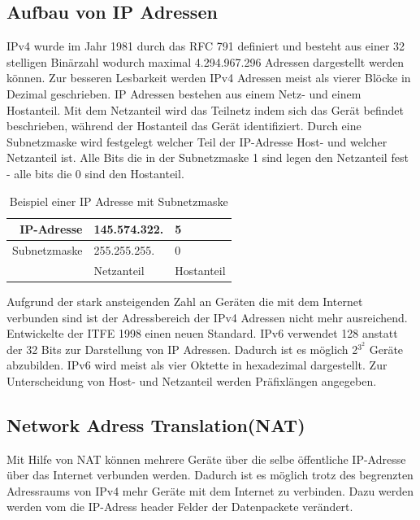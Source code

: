 \subsection{Aufbau von IP Adressen}
IPv4 wurde im Jahr 1981 durch das RFC 791\cite{rfc791} definiert und besteht aus einer 32 stelligen Binärzahl wodurch maximal 4.294.967.296 Adressen dargestellt werden können. Zur besseren Lesbarkeit werden IPv4 Adressen meist als vierer Blöcke in Dezimal geschrieben. IP Adressen bestehen aus einem Netz- und einem Hostanteil. Mit dem Netzanteil wird das Teilnetz indem sich das Gerät befindet beschrieben, während der Hostanteil das Gerät identifiziert. Durch eine Subnetzmaske wird festgelegt welcher Teil der IP-Adresse Host- und welcher Netzanteil ist. Alle Bits die in der Subnetzmaske 1 sind legen den Netzanteil fest - alle bits die 0 sind den Hostanteil.

\begin{table}
\begin{center}
\caption{Beispiel einer IP Adresse mit Subnetzmaske}
\begin{tabular}{|r|l|l|}
	\hline
	IP-Adresse & 145.574.322. & 5 \\ \hline
	Subnetzmaske & 255.255.255. & 0 \\ \hline
	& Netzanteil & Hostanteil \\
	\hline
\end{tabular}
\end{center}
\end{table}


Aufgrund der stark ansteigenden Zahl an Geräten die mit dem Internet verbunden sind ist der Adressbereich der IPv4 Adressen nicht mehr ausreichend. Entwickelte der ITFE 1998 einen neuen Standard. IPv6 verwendet 128 anstatt der 32 Bits zur Darstellung von IP Adressen. Dadurch ist es möglich 2$^3^2$ Geräte abzubilden. IPv6 wird meist als vier Oktette in hexadezimal dargestellt. Zur Unterscheidung von Host- und Netzanteil werden Präfixlängen angegeben.  

\subsection{Network Adress Translation(NAT)}
Mit Hilfe von NAT können mehrere Geräte über die selbe öffentliche IP-Adresse über das Internet verbunden werden. Dadurch ist es möglich trotz des begrenzten Adressraums von IPv4 mehr Geräte mit dem Internet zu verbinden. Dazu werden werden vom die IP-Adress header Felder der Datenpackete verändert. 


